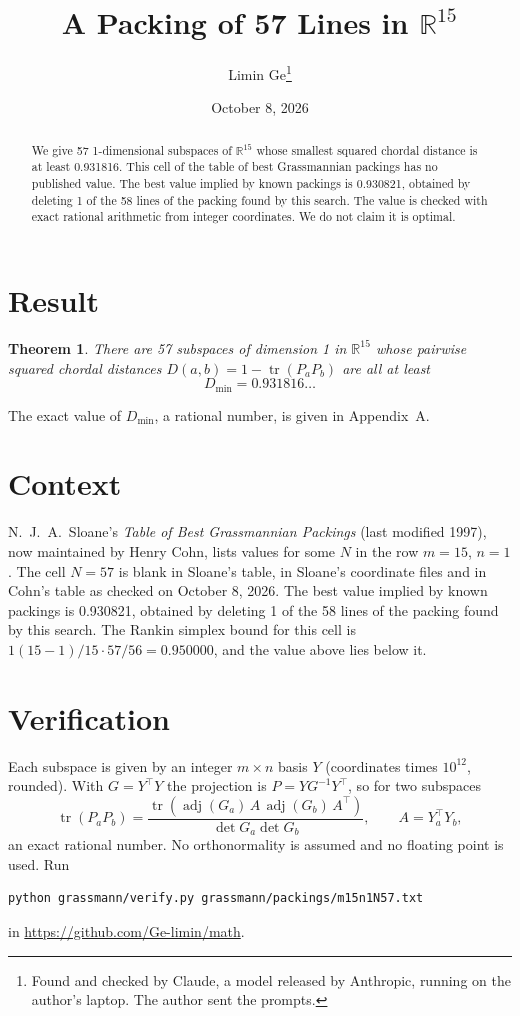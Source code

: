 \documentclass[11pt,a4paper]{article}
\title{A Packing of 57 Lines in $\mathbb{R}^{15}$}
\author{Limin Ge\thanks{Found and checked by Claude, a model released by Anthropic, running on the author's laptop. The author sent the prompts.}}
\date{October 8, 2026}
\newtheorem*{theorem}{Theorem}
\begin{document}
\maketitle
\begin{abstract}
We give 57 1-dimensional subspaces of $\mathbb{R}^{15}$ whose smallest squared chordal distance is at least 0.931816. This cell of the table of best Grassmannian packings has no published value. The best value implied by known packings is 0.930821, obtained by deleting 1 of the 58 lines of the packing found by this search. The value is checked with exact rational arithmetic from integer coordinates. We do not claim it is optimal.
\end{abstract}

\section{Result}
\begin{theorem}
There are 57 subspaces of dimension 1 in $\mathbb{R}^{15}$ whose pairwise squared chordal distances $D(a,b) = 1 - \operatorname{tr}(P_aP_b)$ are all at least
\[ D_{\min} = 0.931816\ldots \]
\end{theorem}
The exact value of $D_{\min}$, a rational number, is given in Appendix~A.


\section{Context}
N.~J.~A.~Sloane's \emph{Table of Best Grassmannian Packings} (last modified 1997), now maintained by Henry Cohn, lists values for some $N$ in the row $m=15$, $n=1$. The cell $N=57$ is blank in Sloane's table, in Sloane's coordinate files and in Cohn's table as checked on October 8, 2026. The best value implied by known packings is 0.930821, obtained by deleting 1 of the 58 lines of the packing found by this search. The Rankin simplex bound for this cell is $1(15-1)/15\cdot 57/56 = 0.950000$, and the value above lies below it.


\section{Verification}
Each subspace is given by an integer $m\times n$ basis $Y$ (coordinates times $10^{12}$, rounded). With $G=Y^\top Y$ the projection is $P=YG^{-1}Y^\top$, so for two subspaces
\[ \operatorname{tr}(P_aP_b)=\frac{\operatorname{tr}(\operatorname{adj}(G_a)\,A\,\operatorname{adj}(G_b)\,A^\top)}{\det G_a\det G_b},\qquad A=Y_a^\top Y_b, \]
an exact rational number. No orthonormality is assumed and no floating point is used. Run
\begin{verbatim}
python grassmann/verify.py grassmann/packings/m15n1N57.txt
\end{verbatim}
in \url{https://github.com/Ge-limin/math}.
\end{document}
